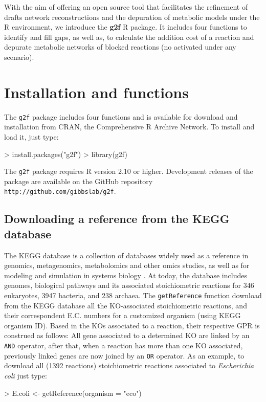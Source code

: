 With the aim of offering an open source tool that facilitates the refinement of drafts network reconstructions and the depuration of metabolic models under the R environment, we introduce the \textbf{g2f} R package. It includes four functions to identify and fill gaps, as well as, to calculate the addition cost of a reaction and depurate metabolic networks of blocked reactions (no activated under any scenario).
\section{Installation and functions}
The \texttt{g2f} package includes four functions and is available for download and installation from CRAN, the
Comprehensive R Archive Network. To install and load it, just type:
\begin{Schunk}
\begin{Sinput}
> install.packages("g2f")
> library(g2f)
\end{Sinput}
\end{Schunk}
The \texttt{g2f} package requires R version 2.10 or higher. Development releases of the package are available on the GitHub repository \texttt{http://github.com/gibbslab/g2f}.
\subsection*{Downloading a reference from the KEGG database}
The KEGG database is a collection of databases widely used as a reference in genomics, metagenomics, metabolomics and other omics studies, as well as for modeling and simulation in systems biology \cite{kanehisa2006genomics}. At today, the database includes genomes, biological pathways and its associated stoichiometric reactions for 346 eukaryotes, 3947 bacteria, and 238 archaea. The \texttt{getReference} function download from the KEGG database all the KO-associated stoichiometric reactions, and their correspondent E.C. numbers for a customized organism (using KEGG organism ID). Based in the KOs associated to a reaction, their respective GPR is construed as follows: All gene associated to a determined KO are linked by an \texttt{AND} operator, after that, when a reaction has more than one KO associated, previously linked genes are now joined by an \texttt{OR} operator. As an example, to download all (1392 reactions) stoichiometric reactions associated to \textit{Escherichia coli} just type:
\begin{Schunk}
\begin{Sinput}
> E.coli <- getReference(organism = "eco")
\end{Sinput}
\end{Schunk}
